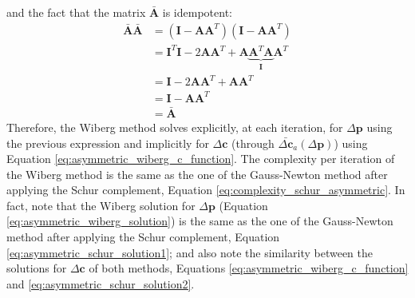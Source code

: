 and the fact that the matrix $\bar{\mathbf{A}}$ is idempotent:
 \begin{equation}
    \begin{aligned}
    	\bar{\mathbf{A}}\bar{\mathbf{A}} & = \left( \mathbf{I} - \mathbf{A}\mathbf{A}^T \right) \left( \mathbf{I} - \mathbf{A}\mathbf{A}^T \right)
    	\\
    	& = \mathbf{I}^T\mathbf{I} - 2\mathbf{A}\mathbf{A}^T + \mathbf{A}\underbrace{\mathbf{A}^T\mathbf{A}}_{\mathbf{I}}\mathbf{A}^T
    	\\
    	& = \mathbf{I} - 2\mathbf{A}\mathbf{A}^T + \mathbf{A}\mathbf{A}^T
    	\\
    	& = \mathbf{I} - \mathbf{A}\mathbf{A}^T 
        \\
        & =\bar{\mathbf{A}} 
    \label{eq:idempotent_bar_A}
    \end{aligned}
\end{equation}
Therefore, the Wiberg method solves explicitly, at each iteration,  for $\Delta\mathbf{p}$ using the previous expression and implicitly for $\Delta\mathbf{c}$ (through $\bar{\Delta \mathbf{c}}_a(\Delta \mathbf{p})$) using Equation \ref{eq:asymmetric_wiberg_c_function}. The complexity per iteration of the Wiberg method is the same as the one of the Gauss-Newton method after applying the Schur complement, Equation \ref{eq:complexity_schur_asymmetric}. In fact, note that the Wiberg solution for $\Delta\mathbf{p}$ (Equation \ref{eq:asymmetric_wiberg_solution}) is the same as the one of the Gauss-Newton method after applying the Schur complement, Equation \ref{eq:asymmetric_schur_solution1}; and also note the similarity between the solutions for $\Delta\mathbf{c}$ of both methods, Equations \ref{eq:asymmetric_wiberg_c_function} and \ref{eq:asymmetric_schur_solution2}.

